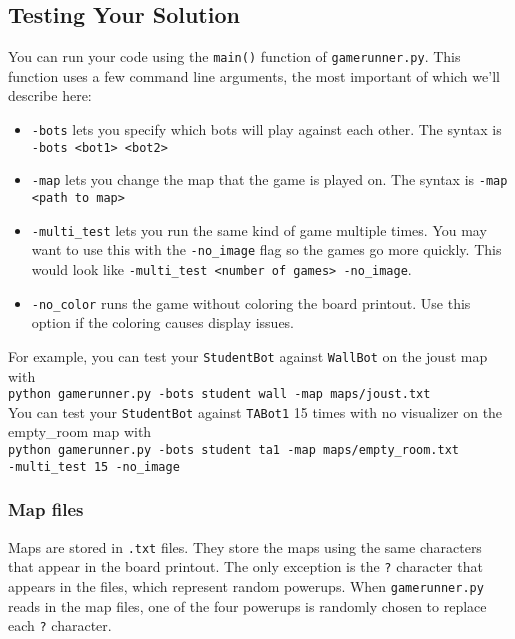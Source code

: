 \documentclass{article}
\begin{document}
    \subsection{Testing Your Solution}
    You can run your code using the \texttt{main()} function of \texttt{gamerunner.py}. This function uses a few command line arguments, the most important of which we'll describe here:
    \begin{itemize}
        \item \texttt{-bots} lets you specify which bots will play against each other. The syntax is \texttt{-bots <bot1> <bot2>}
        \item \texttt{-map} lets you change the map that the game is played on. The syntax is \texttt{-map <path to map>}
        \item \texttt{-multi\_test} lets you run the same kind of game multiple times. You may want to use this with the \texttt{-no\_image} flag so the games go more quickly. This would look like \texttt{-multi\_test <number of games> -no\_image}.
        \item \texttt{-no\_color} runs the game without coloring the board printout. Use this option if the coloring causes display issues.
    \end{itemize}
    For example, you can test your \texttt{StudentBot} against \texttt{WallBot} on the joust map with \\

    \texttt{python gamerunner.py -bots student wall -map maps/joust.txt} \\

    You can test your \texttt{StudentBot} against \texttt{TABot1} 15 times with no visualizer on the empty\_room map with\\

    \texttt{python gamerunner.py -bots student ta1 -map
    maps/empty\_room.txt \\ -multi\_test 15 -no\_image}

    \subsubsection{Map files}
    Maps are stored in \texttt{.txt} files. They store the maps using the same characters that appear in the board printout. The only exception is the \texttt{?} character that appears in the files, which represent random powerups. When \texttt{gamerunner.py} reads in the map files, one of the four powerups is randomly chosen to replace each \texttt{?} character.
\end{document}
